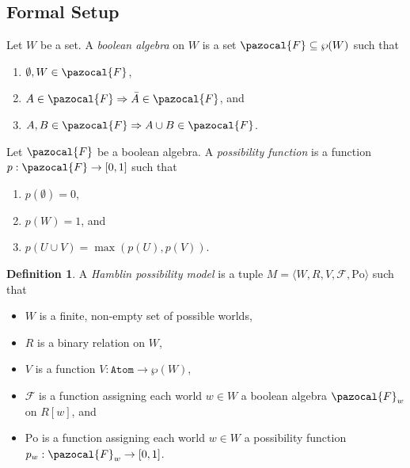 \documentclass{article}
\theoremstyle{definition}
\newtheorem{definition}{Definition}
\newcommand{\F}{\pazocal{F}}
\newcommand{\Po}{\text{Po}}
\begin{document}
\subsection{Formal Setup}
\noindent Let $W$ be a set. A \emph{boolean algebra} on $W$ is a set $\F \subseteq \wp(W)$ such that
\begin{enumerate}[nosep]
  \item $\emptyset, W \in \F$,
  \item $A \in \F \Rightarrow \bar{A} \in \F$, and
  \item $A,B \in \F \Rightarrow A \cup B \in \F$.
\end{enumerate}

\noindent Let $\F$ be a boolean algebra. A \emph{possibility function} is a function $p: \F \rightarrow [0,1]$ such that
\begin{enumerate}[nosep]
  \item $p(\emptyset) = 0$,
  \item $p(W) = 1$, and
  \item $p(U \cup V) = \max(p(U),p(V))$.
\end{enumerate}
\begin{definition}
    A \emph{Hamblin possibility model} is a tuple $M = \langle W,R,V,\mathcal{F},\Po\rangle$ such that
    \begin{itemize}[nosep]
        \renewcommand\labelitemi{--}
      \item $W$ is a finite, non-empty set of possible worlds,
      \item $R$ is a binary relation on $W$,
        \item $V$ is a function $V: \texttt{Atom} \rightarrow \wp(W)$,
        \item $\mathcal{F}$ is a function assigning each world $w \in W$ a boolean algebra $\F_w$ on $R[w]$, and 
          \item $\Po$ is a function assigning each world $w \in W$ a possibility function \\ $p_w: \F_w \rightarrow [0,1]$.
    \end{itemize}
\end{definition}
\end{document}
